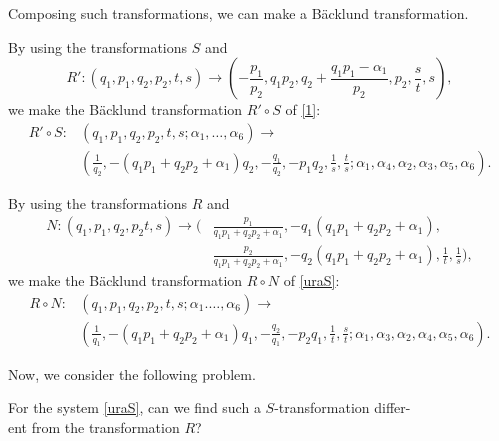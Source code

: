 Composing such transformations, we can make a B{\"a}cklund transformation.
\begin{prop}
By using the transformations $S$ and
\begin{equation}
R':(q_1,p_1,q_2,p_2,t,s) \rightarrow \left(-\frac{p_1}{p_2},q_1p_2,q_2+\frac{q_1p_1-\alpha_1}{p_2},p_2,\frac{s}{t},s\right),
\end{equation}
we make the B{\"a}cklund transformation $R' \circ S$ of \eqref{1}\rm{:\rm}
\begin{align*}
R' \circ S:&(q_1,p_1,q_2,p_2,t,s;\alpha_1,\dots,\alpha_6) \rightarrow\\
&\left(\frac{1}{q_2},-(q_1p_1+q_2p_2+\alpha_1)q_2,-\frac{q_1}{q_2},-p_1q_2,\frac{1}{s},\frac{t}{s};\alpha_1,\alpha_4,\alpha_2,\alpha_3,\alpha_5,\alpha_6\right).
\end{align*}
\end{prop}

\begin{prop}
By using the transformations $R$ and
\begin{align*}
N:(q_1,p_1,q_2,p_2t,s) \rightarrow (&\frac{p_1}{q_1p_1+q_2p_2+\alpha_1},-q_1(q_1p_1+q_2p_2+\alpha_1),\\
&\frac{p_2}{q_1p_1+q_2p_2+\alpha_1},-q_2(q_1p_1+q_2p_2+\alpha_1),\frac{1}{t},\frac{1}{s}),
\end{align*}
we make the B{\"a}cklund transformation $R \circ N$ of \eqref{uraS}\rm{:\rm}
\begin{align*}
R \circ N:&(q_1,p_1,q_2,p_2,t,s;\alpha_1.\dots,\alpha_6) \rightarrow\\
&\left(\frac{1}{q_1},-(q_1p_1+q_2p_2+\alpha_1)q_1,-\frac{q_2}{q_1},-p_2q_1,\frac{1}{t},\frac{s}{t};\alpha_1,\alpha_3,\alpha_2,\alpha_4,\alpha_5,\alpha_6\right).
\end{align*}
\end{prop}



Now, we consider the following problem.
\begin{Problem}
For the system \eqref{uraS}, can we find such a $S$-transformation differ-\\
ent from the transformation $R$?
\end{Problem}

